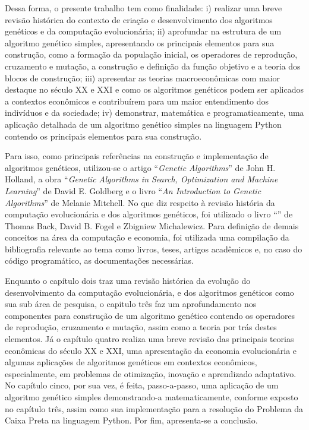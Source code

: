 Dessa forma, o presente trabalho tem como finalidade: i) realizar uma breve revisão histórica do contexto de criação e desenvolvimento dos algoritmos genéticos e da computação evolucionária; ii) aprofundar na estrutura de um algoritmo genético simples, apresentando os principais elementos para sua construção, como a formação da população inicial, os operadores de reprodução, cruzamento e mutação, a construção e definição da função objetivo e a teoria dos blocos de construção; iii) apresentar as teorias macroeconômicas com maior destaque no século XX e XXI e como os algoritmos genéticos podem ser aplicados a contextos econômicos e contribuírem para um maior entendimento dos indivíduos e da sociedade; iv) demonstrar, matemática e programaticamente, uma aplicação detalhada de um algoritmo genético simples na linguagem Python contendo os principais elementos para sua construção.

Para isso, como principais referências na construção e implementação de algoritmos genéticos, utilizou-se o artigo \enquote{\textit{Genetic Algorithms}} de John H. Holland, a obra \enquote{\textit{Genetic Algorithms in Search, Optimization and Machine Learning}} de David E. Goldberg e o livro \enquote{\textit{An Introduction to Genetic Algorithms}} de Melanie Mitchell. No que diz respeito à revisão história da computação evolucionária e dos algoritmos genéticos, foi utilizado o livro \enquote{} de Thomas Back, David B. Fogel e Zbigniew Michalewicz. Para definição de demais conceitos na área da computação e economia, foi utilizada uma compilação da bibliografia relevante ao tema como livros, teses, artigos acadêmicos e, no caso do código programático, as documentações necessárias.

Enquanto o capítulo dois traz uma revisão histórica da evolução do desenvolvimento da computação evolucionária, e dos algoritmos genéticos como sua sub área de pesquisa, o capitulo três faz um aprofundamento nos componentes para construção de um algoritmo genético contendo os operadores de reprodução, cruzamento e mutação, assim como a teoria por trás destes elementos. Já o capítulo quatro realiza uma breve revisão das principais teorias econômicas do século XX e XXI, uma apresentação da economia evolucionária e algumas aplicações de algoritmos genéticos em contextos econômicos, especialmente, em problemas de otimização, inovação e aprendizado adaptativo. No capítulo cinco, por sua vez, é feita, passo-a-passo, uma aplicação de um algoritmo genético simples demonstrando-a matematicamente, conforme exposto no capítulo três, assim como sua implementação para a resolução do Problema da Caixa Preta na linguagem Python. Por fim, apresenta-se a conclusão.
